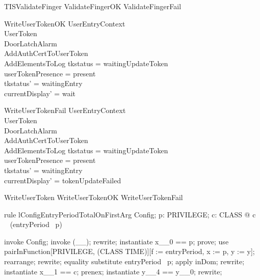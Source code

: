 \begin{zed}
TISValidateFinger  ValidateFingerOK \lor  ValidateFingerFail \lor  [UserTokenTorn | tkstatus = gotFinger]
\end{zed}

\begin{schema}{WriteUserTokenOK}
  UserEntryContext\\
  \Xi UserToken\\
  \Xi DoorLatchAlarm\\
  AddAuthCertToUserToken\\
  AddElementsToLog
\where
  tkstatus = waitingUpdateToken\\
  userTokenPresence = present\\
  tkstatus' = waitingEntry\\
  currentDisplay' = wait
\end{schema}

\begin{schema}{WriteUserTokenFail}
  UserEntryContext\\
  \Xi UserToken\\
  \Xi DoorLatchAlarm\\
  AddAuthCertToUserToken\\
  AddElementsToLog
\where
  tkstatus = waitingUpdateToken\\
  userTokenPresence = present\\
  tkstatus' = waitingEntry\\
  currentDisplay' = tokenUpdateFailed
\end{schema}

\begin{zed}
WriteUserToken  WriteUserTokenOK \lor  WriteUserTokenFail
\end{zed}

\begin{theorem}{rule lConfigEntryPeriodTotalOnFirstArg}
\forall  Config; p: PRIVILEGE; c: CLASS @ c \in  \dom~  (entryPeriod~ p)
\end{theorem}

\begin{zproof}[lConfigEntryPeriodTotalOnFirstArg]
invoke Config;
invoke (\_\fun \_);
rewrite;
instantiate x\_\_0 == p;
prove;
use pairInFunction[PRIVILEGE, \power  (CLASS \cross  \power  TIME)][f := entryPeriod, x := p, y := y];
rearrange;
rewrite;
equality substitute entryPeriod~ p;
apply inDom;
rewrite;
instantiate x\_\_1 == c;
prenex;
instantiate y\_\_4 == y\_\_0;
rewrite;
\end{zproof}

